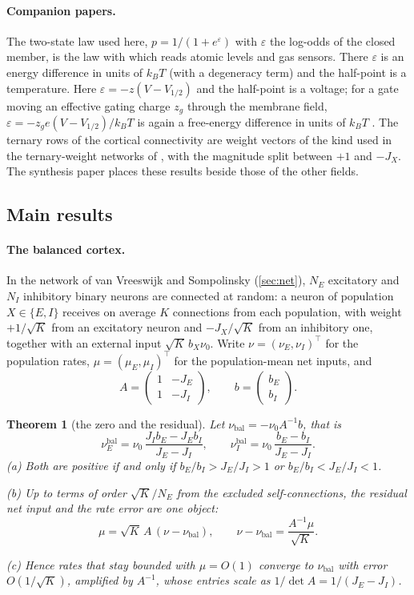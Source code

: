 \documentclass[11pt]{article}
\newtheorem{theorem}{Theorem}
\theoremstyle{definition}\newtheorem{definition}[theorem]{Definition}
\theoremstyle{remark}\newtheorem{remark}[theorem]{Remark}
\begin{document}
\paragraph{Companion papers.} The two-state law used here, $p=1/(1+e^{\varepsilon})$ with $\varepsilon$ the log-odds of the closed member, is the law with which \cite{Chem} reads atomic levels and gas sensors. There $\varepsilon$ is an energy difference in units of $k_BT$ (with a degeneracy term) and the half-point is a temperature. Here $\varepsilon=-z(V-V_{1/2})$ and the half-point is a voltage; for a gate moving an effective gating charge $z_g$ through the membrane field, $\varepsilon=-z_ge(V-V_{1/2})/k_BT$ is again a free-energy difference in units of $k_BT$ \cite{Hille}. The ternary rows of the cortical connectivity are weight vectors of the kind used in the ternary-weight networks of \cite{Algo}, with the magnitude split between $+1$ and $-J_X$. The synthesis paper \cite{Synth} places these results beside those of the other fields.

\subsection{Main results}\label{sec:main}
\paragraph{The balanced cortex.} In the network of van Vreeswijk and Sompolinsky (\cref{sec:net}), $N_E$ excitatory and $N_I$ inhibitory binary neurons are connected at random: a neuron of population $X\in\{E,I\}$ receives on average $K$ connections from each population, with weight $+1/\sqrt K$ from an excitatory neuron and $-J_X/\sqrt K$ from an inhibitory one, together with an external input $\sqrt K\,b_X\nu_0$. Write $\nu=(\nu_E,\nu_I)^{\!\top}$ for the population rates, $\mu=(\mu_E,\mu_I)^{\!\top}$ for the population-mean net inputs, and
\[
A=\begin{pmatrix}1&-J_E\\1&-J_I\end{pmatrix},\qquad b=\begin{pmatrix}b_E\\b_I\end{pmatrix}.
\]

\begin{theorem}[the zero and the residual]\label{thm:zero}
Let $\nu_{\mathrm{bal}}=-\nu_0A^{-1}b$, that is
\[
\nu_E^{\mathrm{bal}}=\nu_0\,\frac{J_Ib_E-J_Eb_I}{J_E-J_I},\qquad \nu_I^{\mathrm{bal}}=\nu_0\,\frac{b_E-b_I}{J_E-J_I}.
\]
(a) Both are positive if and only if $b_E/b_I>J_E/J_I>1$ or $b_E/b_I<J_E/J_I<1$.
\par\noindent(b) Up to terms of order $\sqrt K/N_E$ from the excluded self-connections, the residual net input and the rate error are one object:
\[
\mu=\sqrt K\,A\,(\nu-\nu_{\mathrm{bal}}),\qquad \nu-\nu_{\mathrm{bal}}=\frac{A^{-1}\mu}{\sqrt K}.
\]
\par\noindent(c) Hence rates that stay bounded with $\mu=O(1)$ converge to $\nu_{\mathrm{bal}}$ with error $O(1/\sqrt K)$, amplified by $A^{-1}$, whose entries scale as $1/\det A=1/(J_E-J_I)$.
\end{theorem}
\end{document}
